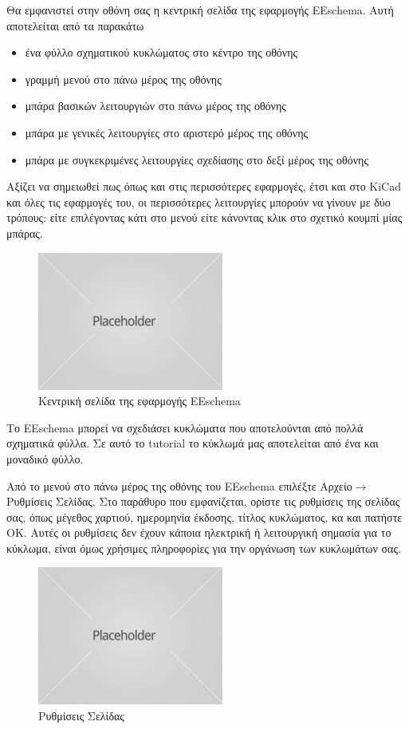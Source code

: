 \documentclass[a4paper]{article}
\begin{document}
Θα εμφανιστεί στην οθόνη σας η κεντρική σελίδα της εφαρμογής EEschema. Αυτή αποτελείται από τα παρακάτω
\begin{itemize}
    \item ένα φύλλο σχηματικού κυκλώματος στο κέντρο της οθόνης
    \item γραμμή μενού στο πάνω μέρος της οθόνης
    \item μπάρα βασικών λειτουργιών στο πάνω μέρος της οθόνης
    \item μπάρα με γενικές λειτουργίες στο αριστερό μέρος της οθόνης
    \item μπάρα με συγκεκριμένες λειτουργίες σχεδίασης στο δεξί μέρος της οθόνης
\end{itemize}
Αξίζει να σημειωθεί πως όπως και στις περισσότερες εφαρμογές, έτσι και στο KiCad και όλες τις εφαρμογές του, οι περισσότερες λειτουργίες μπορούν να γίνουν με δύο τρόπους: είτε επιλέγοντας κάτι στο μενού είτε κάνοντας κλικ στο σχετικό κουμπί μίας μπάρας.

\begin{figure}
  \begin{center}
    \includegraphics{img/kicad-main.png}
    \caption{Κεντρική σελίδα της εφαρμογής EEschema}
    \label{fig:kicad-main}
  \end{center}
\end{figure}

Το EEschema μπορεί να σχεδιάσει κυκλώματα που αποτελούνται από πολλά σχηματικά φύλλα. Σε αυτό το tutorial το κύκλωμά μας αποτελείται από ένα και μοναδικό φύλλο.

Από το μενού στο πάνω μέρος της οθόνης του EEschema επιλέξτε Αρχείο$\rightarrow$Ρυθμίσεις Σελίδας. Στο παράθυρο που εμφανίζεται, ορίστε τις ρυθμίσεις της σελίδας σας, όπως μέγεθος χαρτιού, ημερομηνία έκδοσης, τίτλος κυκλώματος, κα και πατήστε ΟΚ. Αυτές οι ρυθμίσεις δεν έχουν κάποια ηλεκτρική ή λειτουργική σημασία για το κύκλωμα, είναι όμως χρήσιμες πληροφορίες για την οργάνωση των κυκλωμάτων σας.

\begin{figure}
  \begin{center}
    \includegraphics{img/kicad-main.png}
    \caption{Ρυθμίσεις Σελίδας}
    \label{fig:kicad-main}
  \end{center}
\end{figure}
\end{document}
